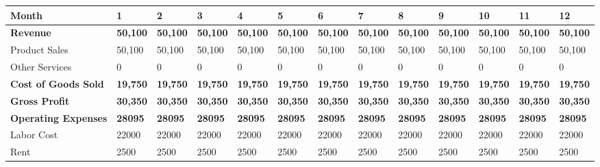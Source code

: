 \begin{tabular}{lllllllllllll}
\hline
 Month                            & 1              & 2              & 3              & 4              & 5              & 6              & 7              & 8              & 9              & 10             & 11             & 12             \\
\hline
 \hline \textbf{Revenue}            & \textbf{50,100} & \textbf{50,100} & \textbf{50,100} & \textbf{50,100} & \textbf{50,100} & \textbf{50,100} & \textbf{50,100} & \textbf{50,100} & \textbf{50,100} & \textbf{50,100} & \textbf{50,100} & \textbf{50,100} \\
 Product Sales                    & 50,100         & 50,100         & 50,100         & 50,100         & 50,100         & 50,100         & 50,100         & 50,100         & 50,100         & 50,100         & 50,100         & 50,100         \\
 Other Services                   & 0              & 0              & 0              & 0              & 0              & 0              & 0              & 0              & 0              & 0              & 0              & 0              \\
 \hline \textbf{Cost of Goods Sold} & \textbf{19,750} & \textbf{19,750} & \textbf{19,750} & \textbf{19,750} & \textbf{19,750} & \textbf{19,750} & \textbf{19,750} & \textbf{19,750} & \textbf{19,750} & \textbf{19,750} & \textbf{19,750} & \textbf{19,750} \\
 \hline \textbf{Gross Profit}       & \textbf{30,350} & \textbf{30,350} & \textbf{30,350} & \textbf{30,350} & \textbf{30,350} & \textbf{30,350} & \textbf{30,350} & \textbf{30,350} & \textbf{30,350} & \textbf{30,350} & \textbf{30,350} & \textbf{30,350} \\
 \hline \textbf{Operating Expenses} & \textbf{28095}  & \textbf{28095}  & \textbf{28095}  & \textbf{28095}  & \textbf{28095}  & \textbf{28095}  & \textbf{28095}  & \textbf{28095}  & \textbf{28095}  & \textbf{28095}  & \textbf{28095}  & \textbf{28095}  \\
 Labor Cost                       & 22000          & 22000          & 22000          & 22000          & 22000          & 22000          & 22000          & 22000          & 22000          & 22000          & 22000          & 22000          \\
 Rent                             & 2500           & 2500           & 2500           & 2500           & 2500           & 2500           & 2500           & 2500           & 2500           & 2500           & 2500           & 2500           \\

\end{tabular}
